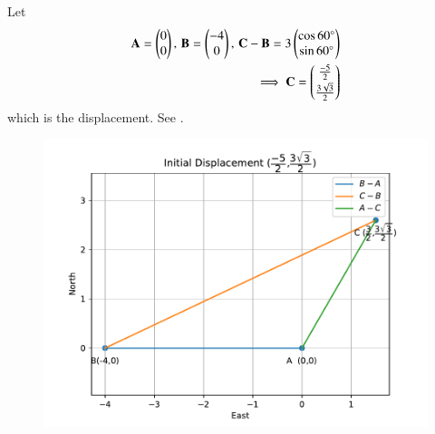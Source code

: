 		Let 
\begin{align}
	\mathbf{A}=\begin{pmatrix}0\\0\end{pmatrix},\,
			\mathbf{B}=\begin{pmatrix}-4\\0\end{pmatrix},\,
	 \mathbf{C}-\mathbf{B}=3\begin{pmatrix}\cos{60\degree}\\\sin{60\degree}\end{pmatrix}
	 \\
	 \implies 
	\mathbf{C}  
=\begin{pmatrix}\frac{-5}{2}\\[2pt] \frac{3\sqrt{3}}{2}\end{pmatrix}
\end{align}
which is the displacement. 
See  
.
\begin{figure}[!h] 
 \begin{center} 
 \includegraphics[width=\columnwidth]{chapters/12/10/5/3/figs/fig.pdf} 
 \end{center} 
\caption{} 
\label{fig:chapters/12/10/5/3Fig1} 
\end{figure}
